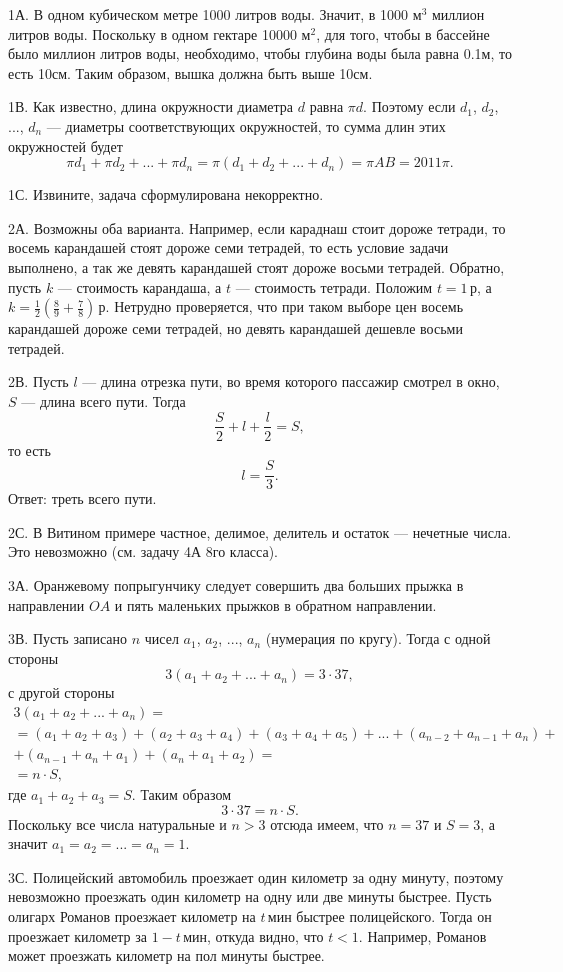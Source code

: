 \documentclass[12pt]{amsart}
\theoremstyle{definition}
\theoremstyle{remark}
\theoremstyle{plain}
\begin{document}
1А. В одном кубическом метре 1000 литров воды. Значит, в 1000 м$^3$ миллион литров воды. Поскольку в одном гектаре 10000 м$^2$, для того, чтобы в бассейне было миллион литров воды, необходимо, чтобы глубина воды была равна 0.1м, то есть 10см. Таким образом, вышка должна быть выше 10см.

1В. Как известно, длина окружности диаметра $d$ равна $\pi d$. Поэтому если $d_1$, $d_2$, ..., $d_n$ --- диаметры соответствующих окружностей, то сумма длин этих окружностей будет
$$
\pi d_1+\pi d_2+...+\pi d_n=\pi (d_1+d_2+...+d_n)=\pi AB=2011\pi.
$$

1С. Извините, задача сформулирована некорректно.

2А. Возможны оба варианта. Например, если караднаш стоит дороже тетради, то восемь карандашей стоят дороже семи тетрадей, то есть условие задачи выполнено, а так же девять карандашей стоят дороже восьми тетрадей. Обратно, пусть $k$ --- стоимость карандаша, а $t$ --- стоимость тетради. Положим $t=1\,\text{р}$, а $k=\frac{1}{2}(\frac{8}{9}+\frac{7}{8})\,\text{р}$. Нетрудно проверяется, что при таком выборе цен восемь карандашей дороже семи тетрадей, но девять карандашей дешевле восьми тетрадей.

2В. Пусть $l$ --- длина отрезка пути, во время которого пассажир смотрел в окно, $S$ --- длина всего пути. Тогда
$$
\frac{S}{2}+l+\frac{l}{2}=S,
$$
то есть
$$
l=\frac{S}{3}.
$$
Ответ: треть всего пути.

2С. В Витином примере частное, делимое, делитель и остаток --- нечетные числа. Это невозможно (см. задачу 4А 8го класса).

3А. Оранжевому попрыгунчику следует совершить два больших прыжка в направлении $OA$ и пять маленьких прыжков в обратном направлении.

3В. Пусть записано $n$ чисел $a_1$, $a_2$, ..., $a_n$ (нумерация по кругу). Тогда с одной стороны
$$
3(a_1+a_2+...+a_n)=3\cdot 37,
$$
с другой стороны
$$\begin{array}{l}
3(a_1+a_2+...+a_n)=\\
=(a_1+a_2+a_3)+(a_2+a_3+a_4)+(a_3+a_4+a_5)+...+(a_{n-2}+a_{n-1}+a_{n})+\\
+(a_{n-1}+a_{n}+a_1)+(a_{n}+a_{1}+a_2)=\\
=n\cdot S,
\end{array}$$
где $a_1+a_2+a_3=S$. Таким образом
$$
3\cdot 37=n\cdot S.
$$
Поскольку все числа натуральные и $n>3$ отсюда имеем, что $n=37$ и $S=3$, а значит $a_1=a_2=...=a_n=1$.

3С. Полицейский автомобиль проезжает один километр за одну минуту, поэтому невозможно проезжать один километр на одну или две минуты быстрее. Пусть олигарх Романов проезжает километр на $t\,\text{мин}$ быстрее полицейского. Тогда он проезжает километр за $1-t\,\text{мин}$, откуда видно, что $t<1$. Например, Романов может проезжать километр на пол минуты быстрее.
\end{document}
